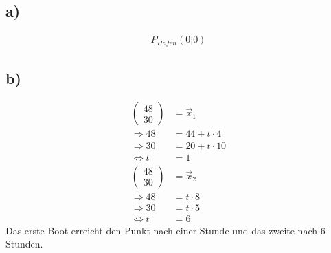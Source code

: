 \documentclass[12pt,a4paper]{report}
\begin{document}
	\subsection{a)}
	\begin{align*}
		P_{Hafen}(0|0)
	\end{align*}
	\subsection{b)}
	\begin{align*}
		\begin{pmatrix}
			48 \\ 30
		\end{pmatrix} &= \overrightarrow x_1 \\
		\Rightarrow 48 &= 44 + t\cdot 4 \\
		\Rightarrow 30 &= 20 + t\cdot 10 \\
		\Leftrightarrow t &= 1 \\
		\begin{pmatrix}
			48 \\ 30
		\end{pmatrix} &= \overrightarrow x_2 \\
		\Rightarrow 48 &= t \cdot 8 \\
		\Rightarrow 30 &= t \cdot 5 \\
		\Leftrightarrow t &= 6
	\end{align*}
	Das erste Boot erreicht den Punkt nach einer Stunde und das zweite nach 6 Stunden.
\end{document}
